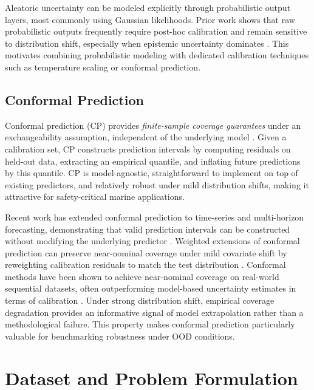 \documentclass[a4paper,fleqn]{cas-sc}
\begin{document}
Aleatoric uncertainty can be modeled explicitly through probabilistic output layers, most commonly using Gaussian likelihoods. Prior work shows that raw probabilistic outputs frequently require post-hoc calibration \cite{guo2017calibration} and remain sensitive to distribution shift, especially when epistemic uncertainty dominates \cite{ovadia2019can, foldesi2023comparison}. This motivates combining probabilistic modeling with dedicated calibration techniques such as temperature scaling \cite{guo2017calibration} or conformal prediction.

\subsection{Conformal Prediction}

Conformal prediction (CP) provides \emph{finite-sample coverage guarantees} under an exchangeability assumption, independent of the underlying model \cite{vovk2005algorithmic, angelopoulos2023conformal}. Given a calibration set, CP constructs prediction intervals by computing residuals on held-out data, extracting an empirical quantile, and inflating future predictions by this quantile. CP is model-agnostic, straightforward to implement on top of existing predictors, and relatively robust under mild distribution shifts, making it attractive for safety-critical marine applications.

Recent work has extended conformal prediction to time-series and multi-horizon forecasting, demonstrating that valid prediction intervals can be constructed without modifying the underlying predictor \cite{stankeviciute2021conformal, angelopoulos2023conformal}. Weighted extensions of conformal prediction can preserve near-nominal coverage under mild covariate shift by reweighting calibration residuals to match the test distribution \cite{tibshirani2019conformal}. Conformal methods have been shown to achieve near-nominal coverage on real-world sequential datasets, often outperforming model-based uncertainty estimates in terms of calibration \cite{stankeviciute2021conformal, angelopoulos2023conformal}. Under strong distribution shift, empirical coverage degradation provides an informative signal of model extrapolation rather than a methodological failure. This property makes conformal prediction particularly valuable for benchmarking robustness under OOD conditions.


\section{Dataset and Problem Formulation}
\end{document}

